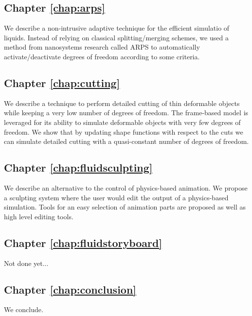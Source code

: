 \subsection*{Chapter \ref{chap:arps}}
We describe a non-intrusive adaptive technique for the efficient simulatio of liquids. Instead of relying on classical splitting/merging schemes, we used a method from nanosystems research called ARPS to automatically activate/deactivate degrees of freedom according to some criteria. \\

\subsection*{Chapter \ref{chap:cutting}}
We describe a technique to perform detailed cutting of thin deformable objects while keeping a very low number of degrees of freedom. The frame-based model is leveraged for its ability to simulate deformable objects with very few degrees of freedom. We show that by updating shape functions with respect to the cuts we can simulate detailed cutting with a quasi-constant number of degrees of freedom. \\

\subsection*{Chapter \ref{chap:fluidsculpting}}
We describe an alternative to the control of physics-based animation. We propose a sculpting system where the user would edit the output of a physics-based simulation. Tools for an easy selection of animation parts are proposed as well as high level editing tools. \\

\subsection*{Chapter \ref{chap:fluidstoryboard}}
Not done yet...\\

\subsection*{Chapter \ref{chap:conclusion}}
We conclude.

